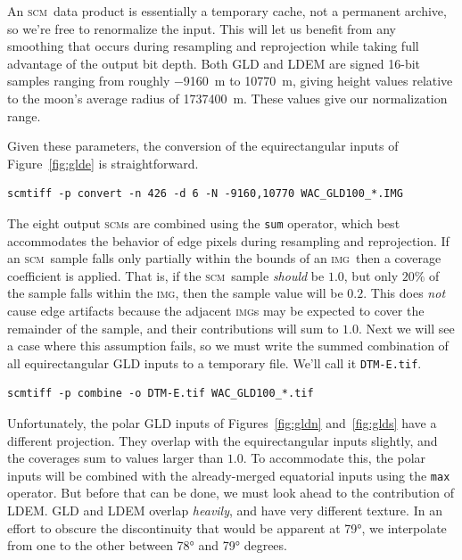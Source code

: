 \documentclass[oneside,10pt]{memoir}
\newcommand{\scm}     {\textsc{scm}}
\newcommand{\img}     {\textsc{img}}
\begin{document}
\begin{Spacing}{1.1}
An \scm\ data product is essentially a temporary cache, not a permanent archive, so we're free to renormalize the input. This will let us benefit from any smoothing that occurs during resampling and reprojection while taking full advantage of the output bit depth. Both GLD and LDEM are signed 16-bit samples ranging from roughly \SI{-9160}{\meter} to \SI{10770}{\meter}, giving height values relative to the moon's average radius of \SI{1737400}{\meter}. These values give our normalization range.

Given these parameters, the conversion of the equirectangular inputs of Figure~\ref{fig:glde} is straightforward.

\begin{Verbatim}
scmtiff -p convert -n 426 -d 6 -N -9160,10770 WAC_GLD100_*.IMG
\end{Verbatim}

The eight output \scm s are combined using the \texttt{sum} operator, which best accommodates the behavior of edge pixels during resampling and reprojection. If an \scm\ sample falls only partially within the bounds of an \img\ then a coverage coefficient is applied. That is, if the \scm\ sample \emph{should} be $1.0$, but only $20\%$ of the sample falls within the \img, then the sample value will be $0.2$. This does \emph{not} cause edge artifacts because the adjacent \img s may be expected to cover the remainder of the sample, and their contributions will sum to $1.0$. Next we will see a case where this assumption fails, so we must write the summed combination of all equirectangular GLD inputs to a temporary file. We'll call it \texttt{DTM-E.tif}.

\begin{Verbatim}
scmtiff -p combine -o DTM-E.tif WAC_GLD100_*.tif
\end{Verbatim}

Unfortunately, the polar GLD inputs of Figures~\ref{fig:gldn} and~\ref{fig:glds} have a different projection. They overlap with the equirectangular inputs slightly, and the coverages sum to values larger than $1.0$. To accommodate this, the polar inputs will be combined with the already-merged equatorial inputs using the \texttt{max} operator. But before that can be done, we must look ahead to the contribution of LDEM. GLD and LDEM overlap \emph{heavily}, and have very different texture. In an effort to obscure the discontinuity that would be apparent at \ang{79}, we interpolate from one to the other between \ang{78} and \ang{79} degrees.


\end{Spacing}
\end{document}
